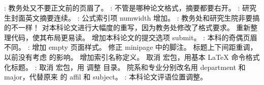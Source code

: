 \markdownRendererUlItem {}: 教务处又不要正文前的页眉了。\markdownRendererUlItemEnd 
\markdownRendererUlItem {}: 不管是哪种论文格式，摘要都要右开。\markdownRendererUlItemEnd 
\markdownRendererUlItem {}: 研究生封面英文摘要连续。\markdownRendererUlItemEnd 
\markdownRendererUlItem {}: 公式索引项 numwidth 增加。\markdownRendererUlItemEnd 
\markdownRendererUlItem {}: 教务处和研究生院非要搞的不一样！\markdownRendererUlItemEnd 
\markdownRendererUlEnd \markdownRendererInterblockSeparator
{}\markdownRendererInterblockSeparator
{}\markdownRendererInterblockSeparator
{}\markdownRendererUlBegin
\markdownRendererUlItem 对本科论文进行大幅度的重写，因为教务处修改了格式要求。\markdownRendererUlItemEnd 
\markdownRendererUlItem 重新整理代码，使其布局更易读。\markdownRendererUlItemEnd 
\markdownRendererUlItem 增加本科论文的提交选项 submit。\markdownRendererUlItemEnd 
\markdownRendererUlItem {}: 本科的奇偶页眉不同。\markdownRendererUlItemEnd 
\markdownRendererUlItem {}: 增加 empty 页面样式。\markdownRendererUlItemEnd 
\markdownRendererUlItem 修正 minipage 中的脚注。\markdownRendererUlItemEnd 
\markdownRendererUlItem 标题上下间距重调，以前没有考虑  的影响。\markdownRendererUlItemEnd 
\markdownRendererUlItem 增加索引名称定义。\markdownRendererUlItemEnd 
\markdownRendererUlItem 取消  宏包，用基本 LaTeX 命令格式化标题。\markdownRendererUlItemEnd 
\markdownRendererUlItem {}: 取消  宏包，用  调整 目录。\markdownRendererUlItemEnd 
\markdownRendererUlItem 院系和专业分别改名用 department 和 major，代替原来 的 affil 和 subject。\markdownRendererUlItemEnd 
\markdownRendererUlItem {}: 本科论文评语位置调整。\markdownRendererUlItemEnd 
